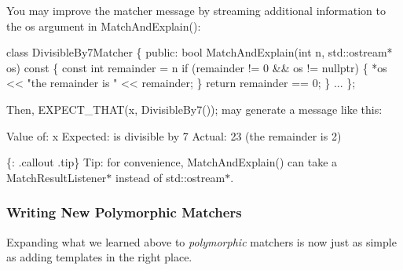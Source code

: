 You may improve the matcher message by streaming additional information to the {\ttfamily os} argument in {\ttfamily Match\+And\+Explain()}\+:


\begin{DoxyCode}
\textcolor{keyword}{class }DivisibleBy7Matcher \{
 \textcolor{keyword}{public}:
  \textcolor{keywordtype}{bool} MatchAndExplain(\textcolor{keywordtype}{int} n, std::ostream* os)\textcolor{keyword}{ const }\{
    \textcolor{keyword}{const} \textcolor{keywordtype}{int} remainder = n %
    \textcolor{keywordflow}{if} (remainder != 0 && os != \textcolor{keyword}{nullptr}) \{
      *os << \textcolor{stringliteral}{"the remainder is "} << remainder;
    \}
    \textcolor{keywordflow}{return} remainder == 0;
  \}
  ...
\};
\end{DoxyCode}


Then, {\ttfamily E\+X\+P\+E\+C\+T\+\_\+\+T\+H\+A\+T(x, Divisible\+By7());} may generate a message like this\+:


\begin{DoxyCode}
Value of: x
Expected: is divisible by 7
  Actual: 23 (the remainder is 2)
\end{DoxyCode}


\{\+: .callout .tip\} Tip\+: for convenience, {\ttfamily Match\+And\+Explain()} can take a {\ttfamily Match\+Result\+Listener$\ast$} instead of {\ttfamily std\+::ostream$\ast$}.

\subsubsection*{Writing New Polymorphic Matchers}

Expanding what we learned above to {\itshape polymorphic} matchers is now just as simple as adding templates in the right place.


